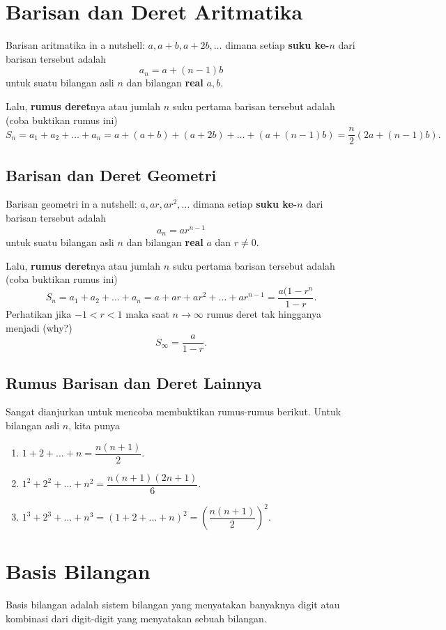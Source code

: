 \documentclass[11pt]{scrartcl}
\begin{document}
\section{Barisan dan Deret Aritmatika}
    Barisan aritmatika in a nutshell: $a,a+b,a+2b,\dots$ dimana setiap \textbf{suku ke-$n$} dari barisan tersebut adalah $$a_n=a+(n-1)b$$ untuk suatu bilangan asli $n$ dan bilangan \textbf{real} $a,b$.
    
    Lalu, \textbf{rumus deret}nya atau jumlah $n$ suku pertama barisan tersebut adalah (coba buktikan rumus ini) $$S_n = a_1+a_2+\dots+a_n=a+(a+b)+(a+2b)+\dots+(a+(n-1)b)=\dfrac{n}{2}(2a+(n-1)b).$$
    
    \subsection{Barisan dan Deret Geometri}
     Barisan geometri in a nutshell: $a,ar,ar^2,\dots$ dimana setiap \textbf{suku ke-$n$} dari barisan tersebut adalah $$a_n=ar^{n-1}$$ untuk suatu bilangan asli $n$ dan bilangan \textbf{real} $a$ dan $r \neq 0$.
    
    Lalu, \textbf{rumus deret}nya atau jumlah $n$ suku pertama barisan tersebut adalah (coba buktikan rumus ini) $$S_n = a_1+a_2+\dots+a_n=a+ar+ar^2+\dots+ar^{n-1}=\dfrac{a(1-r^n}{1-r}.$$
    Perhatikan jika $-1 < r < 1$ maka saat $n \rightarrow \infty$ rumus deret tak hingganya menjadi (why?) $$S_\infty =  \dfrac{a}{1-r}.$$
    
    \subsection{Rumus Barisan dan Deret Lainnya}
    Sangat dianjurkan untuk mencoba membuktikan rumus-rumus berikut. Untuk bilangan asli $n$, kita punya
    \begin{enumerate}
        \item $1+2+\dots+n = \dfrac{n(n+1)}{2}.$
        \item $1^2+2^2+\dots+n^2 = \dfrac{n(n+1)(2n+1)}{6}.$
        \item $1^3+2^3+\dots+n^3 = \left(1+2+\dots+n\right)^2= \left(\dfrac{n(n+1)}{2}\right)^2.$
    \end{enumerate}
    
    \section{Basis Bilangan}
        Basis bilangan adalah sistem bilangan yang menyatakan banyaknya digit atau kombinasi dari digit-digit yang menyatakan sebuah bilangan.
        
\end{document}
